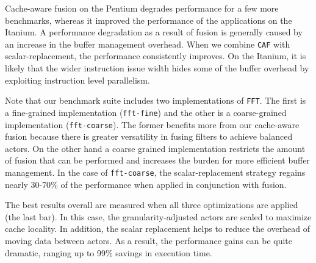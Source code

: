 Cache-aware fusion on the Pentium degrades performance for a few more benchmarks,
whereas it improved the performance of the applications on the Itanium.
A performance degradation as a result of fusion is generally caused by
an increase in the buffer management overhead. When
we combine \texttt{CAF} with scalar-replacement, the
performance consistently improves. On the Itanium, it is likely that
the wider instruction issue width hides some of the buffer overhead by
exploiting instruction level parallelism.

Note that our benchmark suite
includes two implementations of \texttt{FFT}. The first is a
fine-grained implementation (\texttt{fft-fine}) and the other is a
coarse-grained implementation (\texttt{fft-coarse}). The former
benefits more from our cache-aware fusion because there is greater
versatility in fusing filters to achieve balanced actors. On the other hand
a coarse grained implementation restricts the amount of fusion that
can be performed and increases the burden for more efficient buffer
management. In the case of \texttt{fft-coarse}, the scalar-replacement
strategy regains nearly 30-70\% of the performance when applied in
conjunction with fusion.

The best results overall are measured when all three optimizations are
applied (the last bar). In this case, the granularity-adjusted actors
are scaled to maximize cache locality. In addition, the scalar replacement
helps to reduce the overhead of moving data
between actors. As a result, the performance gains can be quite
dramatic, ranging up to 99\% savings in execution time.

